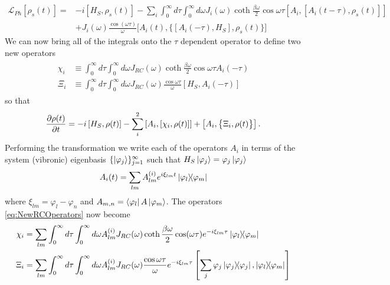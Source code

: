 \documentclass[]{article}
\begin{document}
\begin{equation}
\begin{split}
\mathcal{L}_{Ph}[\rho_s(t)] = &-i[H_S, \rho_s(t)] - \sum_i \int_{0}^{\infty}d\tau \int_{0}^{\infty}d\omega J_i(\omega)\coth\frac{\beta \omega}{2} \cos\omega\tau [A_i,[A_i(t-\tau), \rho_s(t)]] \\
&+J_i(\omega)\frac{\cos(\omega\tau)}{\omega} \big[A_i(t), \big\{[A_i(-\tau), H_S], \rho_s(t)\big\}\big]
\end{split}
\end{equation}
We can now bring all of the integrals onto the $\tau$ dependent operator to define two new operators
\begin{align}
	\begin{split}
	\label{eq:NewRCOperators}
	\chi_i &\equiv \int_{0}^{\infty}d\tau\int_{0}^{\infty}d\omega   J_{RC}(\omega) \coth\frac{\beta \omega}{2}\cos\omega \tau A_i(-\tau)\\
	\Xi_i &\equiv \int_{0}^{\infty}d\tau\int_{0}^{\infty}d\omega  J_{RC}(\omega) \frac{\cos\omega\tau}{\omega} \left[H_S, A_i(-\tau)\right]
	\end{split}
\end{align}
so that
\begin{equation}
\pdv{\rho(t)}{t} = -i\left[H_S, \rho(t)\right] - \sum_i^2\left[A_i, \left[\chi_i, \rho(t)\right]\right] + \left[A_i, \big\lbrace\Xi_i, \rho(t)\big\rbrace\right].
\end{equation}
Performing the transformation we write each of the operators $A_i$ in terms of the system (vibronic) eigenbasis $\{\ket{\varphi_j}\}_{j=1}^{\infty}$ such that $H_S\ket{\varphi_j}=\varphi_j\ket{\varphi_j}$
\begin{equation}
A_i(t) = \sum_{lm}A_{lm}^{(i)}e^{i\xi_{lm}t} \dyad{\varphi_l}{\varphi_m}
\end{equation}
where $\xi_{lm} = \varphi_l - \varphi_n$ and $A_{m,n} = \bra{\varphi_l}A\ket{\varphi_m}$. The operators \ref{eq:NewRCOperators} now become
\begin{align}
	\label{eq:NewRCOperators}
	\chi_i &= \sum_{lm}\int_{0}^{\infty}d\tau\int_{0}^{\infty}d\omega A_{lm}^{(i)}  J_{RC}(\omega) \coth\frac{\beta \omega}{2}\cos(\omega \tau)e^{-i\xi_{lm}\tau} \dyad{\varphi_l}{\varphi_m}\\
	\Xi_i &= \sum_{lm}\int_{0}^{\infty}d\tau\int_{0}^{\infty}d\omega A_{lm}^{(i)} J_{RC}(\omega) \frac{\cos\omega\tau}{\omega}e^{-i\xi_{lm}\tau}  \left[\sum_{j}\varphi_j\dyad{\varphi_j}{\varphi_j}, \dyad{\varphi_l}{\varphi_m}\right]
\end{align}
\end{document}
